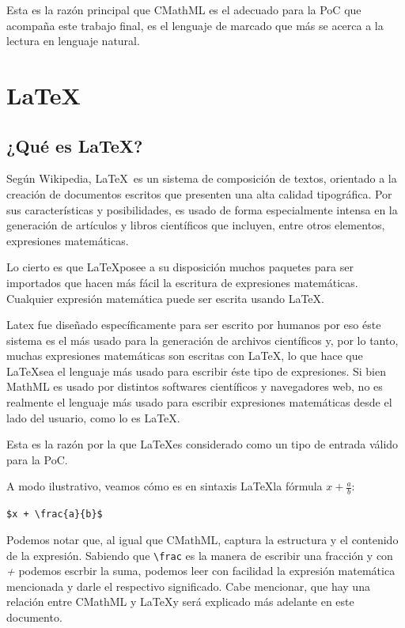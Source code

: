 Esta es la razón principal que CMathML es el adecuado para la PoC que acompaña este trabajo final, es el lenguaje de marcado
que más se acerca a la lectura en lenguaje natural.

\section{\LaTeX}

\subsection{¿Qué es \LaTeX ?}

Según Wikipedia, \LaTeX\ es un sistema de composición de textos, orientado a la creación de documentos escritos que
presenten una alta calidad tipográfica. Por sus características y posibilidades, es usado de forma especialmente intensa en la
generación de artículos y libros científicos que incluyen, entre otros elementos, expresiones matemáticas.

Lo cierto es que \LaTeX posee a su disposición muchos paquetes para ser importados que hacen más fácil la escritura de
expresiones matemáticas. Cualquier expresión matemática puede ser escrita usando \LaTeX.

Latex fue diseñado específicamente para ser escrito por humanos por eso éste sistema es el más usado para la generación de archivos científicos y, por lo tanto, muchas expresiones matemáticas
son escritas con \LaTeX, lo que hace que \LaTeX sea el lenguaje más usado para escribir éste tipo de expresiones.
Si bien MathML es usado por distintos softwares científicos y navegadores web, no es realmente el lenguaje más usado para escribir expresiones matemáticas desde
el lado del usuario, como lo es \LaTeX.

Esta es la razón por la que \LaTeX es considerado como un tipo de entrada válido para la PoC.

A modo ilustrativo, veamos cómo es en sintaxis \LaTeX la fórmula $x + \frac{a}{b}$:

\verb|$x + \frac{a}{b}$|

Podemos notar que, al igual que CMathML, captura la estructura y el contenido de la expresión. Sabiendo que \verb|\frac| es la manera de escribir una fracción y con \textit{+} podemos escrbir la suma, podemos leer con facilidad la expresión matemática mencionada y darle el respectivo significado. Cabe mencionar, que hay una relación entre CMathML y \LaTeX y será explicado más adelante en este documento.

